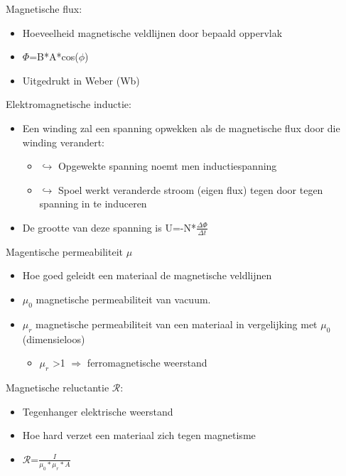 \documentclass[12pt]{article}
\begin{document}
Magnetische flux:\begin{itemize}
    \item Hoeveelheid magnetische veldlijnen door bepaald oppervlak 
    \item $\Phi$=B*A*cos($\phi$)
    \item Uitgedrukt in Weber (Wb)
\end{itemize}
Elektromagnetische inductie:\begin{itemize}
    \item Een winding zal een spanning opwekken als de magnetische flux door die winding verandert:\begin{itemize}
        \item $\hookrightarrow$ Opgewekte spanning noemt men inductiespanning 
        \item $\hookrightarrow$ Spoel werkt veranderde stroom (eigen flux) tegen door tegen spanning in te induceren 
    \end{itemize}
    \item De grootte van deze spanning is U=-N*$\frac{\Delta\Phi}{\Delta t}$
\end{itemize}
Magentische permeabiliteit $\mu$\begin{itemize}
    \item Hoe goed geleidt een materiaal de magnetische veldlijnen 
    \item $\mu_0$ magnetische permeabiliteit van vacuum.
    \item $\mu_r$ magnetische permeabiliteit van een materiaal in vergelijking met $\mu_0$ (dimensieloos)\begin{itemize}
        \item $\mu_r$ >1 $\Rightarrow$ ferromagnetische weerstand 
    \end{itemize}
\end{itemize}
Magnetische reluctantie $\mathcal{R}$:\begin{itemize}
    \item Tegenhanger elektrische weerstand 
    \item Hoe hard verzet een materiaal zich tegen magnetisme 
    \item $\mathcal{R}$=$\frac{I}{\mu_0 *\mu_r *A}$
\end{itemize}
\end{document}
